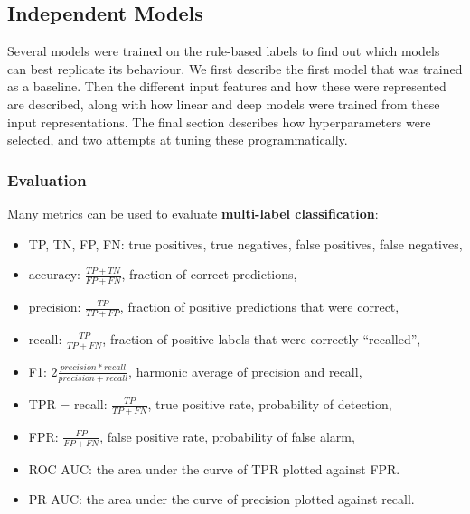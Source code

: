 \subsection{Independent Models}
\label{exp_models}

Several models were trained on the rule-based labels to find out which models can best replicate its behaviour.
We first describe the first model that was trained as a baseline.
Then the different input features and how these were represented are described, along with how linear and deep models were trained from these input representations.
The final section describes how hyperparameters were selected, and two attempts at tuning these programmatically.


\subsubsection{Evaluation}

Many metrics can be used to evaluate \textbf{multi-label classification}:

\begin{itemize}
  \item TP, TN, FP, FN: true positives, true negatives, false positives, false negatives,
  \item accuracy: $\frac{TP + TN}{FP + FN}$, fraction of correct predictions,
  \item precision: $\frac{TP}{TP + FP}$, fraction of positive predictions that were correct,
  \item recall: $\frac{TP}{TP + FN}$, fraction of positive labels that were correctly ``recalled'',
  \item F1: $2\frac{precision * recall}{precision + recall}$, harmonic average of precision and recall,
  \item TPR = recall: $\frac{TP}{TP+FN}$, true positive rate, probability of detection,
  \item FPR: $\frac{FP}{FP+FN}$, false positive rate, probability of false alarm,
  \item ROC AUC: the area under the curve of TPR plotted against FPR.
  \item PR AUC: the area under the curve of precision plotted against recall.
\end{itemize}

